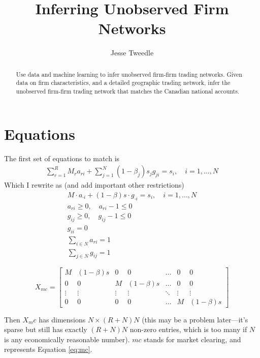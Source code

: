 \documentclass[12pt]{article}
\begin{document}
\title{Inferring Unobserved Firm Networks}
\author{Jesse Tweedle}
\date{}


 \maketitle

\begin{abstract}

Use data and machine learning to infer unobserved firm-firm trading networks. Given data on firm characteristics, and a detailed geographic trading network, infer the unobserved firm-firm trading network that matches the Canadian national accounts.

\end{abstract}

\section{Equations}

The first set of equations to match is 
\begin{gather}
\sum_{r=1}^R M_r a_{ri} + \sum_{j=1}^N (1-\beta_j) s_j g_{ji} = s_i , \quad i = 1,\ldots, N
\end{gather}
Which I rewrite as (and add important other restrictions)
\begin{gather}
\label{eq:mc}
M \cdot a_{\cdot i} + (1-\beta) s \cdot g_{\cdot i} = s_i, \quad i = 1,\ldots, N \\
a_{ri} \geq 0, \quad a_{ri} - 1 \leq 0 \\
g_{ij} \geq 0, \quad g_{ij} - 1\leq 0 \\
g_{ii} = 0 \\
\sum_{i \in N} a_{ri} = 1 \label{eq:rowsuma}\\
\sum_{j \in N} g_{ij} = 1\label{eq:rowsumg}
\end{gather}

\[
X_{mc} = 
\begin{bmatrix}
    M & (1-\beta) s &  0 & 0 & \dots  & 0 & 0\\
    0 & 0 & M & (1-\beta) s &\dots  & 0 & 0 \\
    \vdots & \vdots & \vdots & \vdots & \ddots & \vdots & \vdots  \\
    0 & 0 & 0 & 0 & \dots  & M & (1-\beta) s
\end{bmatrix}
\]

Then $X_mc$ has dimensions $N \times (R+N)N$ (this may be a problem later---it's sparse but still has exactly $(R+N)N$ non-zero entries, which is too many if $N$ is any economically reasonable number). $mc$ stands for market clearing, and represents Equation \eqref{eq:mc}.
\end{document}
